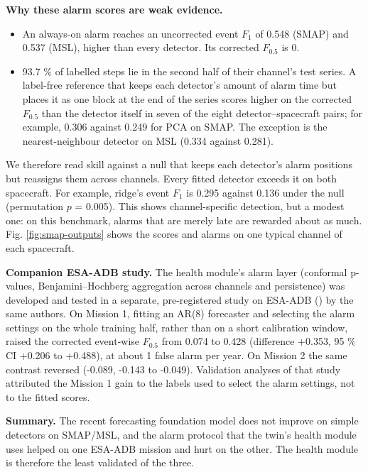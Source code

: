 \documentclass[
]{article}
\providecommand{\tightlist}{%
  \setlength{\itemsep}{0pt}\setlength{\parskip}{0pt}}
\begin{document}
\textbf{Why these alarm scores are weak evidence.}

\begin{itemize}
\tightlist
\item
  An always-on alarm reaches an uncorrected event \(F_1\) of 0.548
  (SMAP) and 0.537 (MSL), higher than every detector. Its corrected
  \(F_{0.5}\) is 0.
\item
  93.7 \% of labelled steps lie in the second half of their channel's
  test series. A label-free reference that keeps each detector's amount
  of alarm time but places it as one block at the end of the series
  scores higher on the corrected \(F_{0.5}\) than the detector itself in
  seven of the eight detector--spacecraft pairs; for example, 0.306
  against 0.249 for PCA on SMAP. The exception is the nearest-neighbour
  detector on MSL (0.334 against 0.281).
\end{itemize}

We therefore read skill against a null that keeps each detector's alarm
positions but reassigns them across channels. Every fitted detector
exceeds it on both spacecraft. For example, ridge's event \(F_1\) is
0.295 against 0.136 under the null (permutation \(p\) = 0.005). This
shows channel-specific detection, but a modest one: on this benchmark,
alarms that are merely late are rewarded about as much. Fig.
\ref{fig:smap-outputs} shows the scores and alarms on one typical
channel of each spacecraft.

\textbf{Companion ESA-ADB study.} The health module's alarm layer
(conformal p-values, Benjamini--Hochberg aggregation across channels and
persistence) was developed and tested in a separate, pre-registered
study on ESA-ADB () by the same authors. On Mission 1, fitting an AR(8) forecaster
and selecting the alarm settings on the whole training half, rather than
on a short calibration window, raised the corrected event-wise
\(F_{0.5}\) from 0.074 to 0.428 (difference +0.353, 95 \% CI +0.206 to
+0.488), at about 1 false alarm per year. On Mission 2 the same contrast
reversed (-0.089, -0.143 to -0.049). Validation analyses of that study
attributed the Mission 1 gain to the labels used to select the alarm
settings, not to the fitted scores.

\textbf{Summary.} The recent forecasting foundation model does not
improve on simple detectors on SMAP/MSL, and the alarm protocol that the
twin's health module uses helped on one ESA-ADB mission and hurt on the
other. The health module is therefore the least validated of the three.
\end{document}
